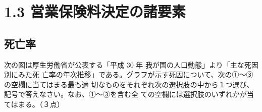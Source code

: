 \documentclass[report,gutter=10mm,fore-edge=10mm,uplatex,dvipdfmx]{jlreq}
\begin{document}




          
    

\section{1.3 営業保険料決定の諸要素}
\subsection{死亡率}

次の図は厚生労働省が公表する「平成 30 年 我が国の人口動態」より「主な死因別にみた死
亡率の年次推移」である。グラフが示す死因について、次の①～③の空欄に当てはまる最も適
切なものをそれぞれ次の選択肢の中から１つ選び、記号で答えなさい。なお、①～③を含む全
ての空欄には選択肢のいずれかが当てはまる。（３点）
\end{document}
